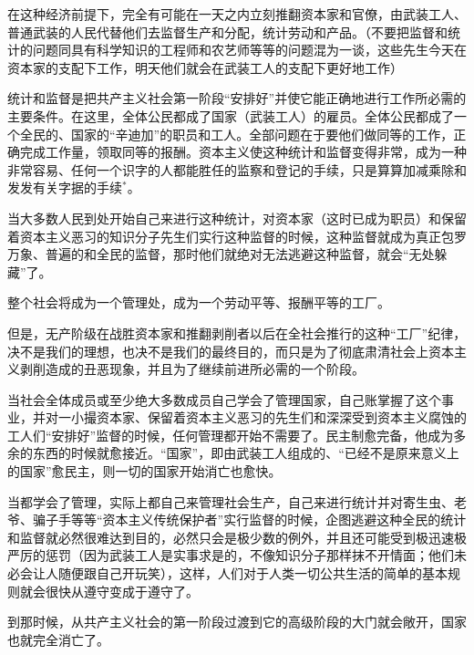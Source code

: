 在这种{\kaishu 经济}前提下，完全有可能在一天之内立刻推翻资本家和官僚，由武装工人、普通武装的人民代替他们去{\kaishu 监督}生产和分配，{\kaishu 统计}劳动和产品。（不要把监督和统计的问题同具有科学知识的工程师和农艺师等等的问题混为一谈，这些先生今天在资本家的支配下工作，明天他们就会在武装工人的支配下更好地工作）


统计和监督是把共产主义社会{\kaishu 第一阶段}“安排好”并使它能正确地进行工作所必需的{\kaishu 主要条件}。在这里，{\kaishu 全体}公民都成了国家（武装工人）的雇员。{\kaishu 全体}公民都成了一个全民的、国家的“辛迪加”的职员和工人。全部问题在于要他们做同等的工作，正确完成工作量，领取同等的报酬。资本主义使这种统计和监督变得非常，成为一种非常容易、任何一个识字的人都能胜任的监察和登记的手续，只是算算加减乘除和发发有关字据的手续$^{*}$。

当{\kaishu 大多数}人民到处开始自己来进行这种统计，对资本家（这时已成为职员）和保留着资本主义恶习的知识分子先生们实行这种监督的时候，这种监督就成为真正包罗万象、普遍的和全民的监督，那时他们就绝对无法逃避这种监督，就会“无处躲藏”了。

整个社会将成为一个管理处，成为一个劳动平等、报酬平等的工厂。

但是，无产阶级在战胜资本家和推翻剥削者以后在全社会推行的这种“工厂”纪律，决不是我们的理想，也决不是我们的最终目的，而只是为了彻底肃清社会上资本主义剥削造成的丑恶现象，并且为了{\kaishu 继续}前进所必需的一个{\kaishu 阶段}。

当社会全体成员或至少绝大多数成员{\kaishu 自己}学会了管理国家，自己账掌握了这个事业，并对一小撮资本家、保留着资本主义恶习的先生们和深深受到资本主义腐蚀的工人们“安排好”监督的时候，任何管理都开始不需要了。民主制愈完备，他成为多余的东西的时候就愈接近。“国家”，即由武装工人组成的、“已经不是原来意义上的国家”愈民主，则{\kaishu 一切的}国家开始消亡也愈快。

当都学会了管理，实际上都自己来管理社会生产，自己来进行统计并对寄生虫、老爷、骗子手等等“资本主义传统保护者”实行监督的时候，企图逃避这种全民的统计和监督就必然很难达到目的，必然只会是极少数的例外，并且还可能受到极迅速极严厉的惩罚（因为武装工人是实事求是的，不像知识分子那样抹不开情面；他们未必会让人随便跟自己开玩笑），这样，人们对于人类一切公共生活的简单的基本规则就会很快从遵守变成于遵守了。

到那时候，从共产主义社会的第一阶段过渡到它的高级阶段的大门就会敞开，国家也就完全消亡了。






